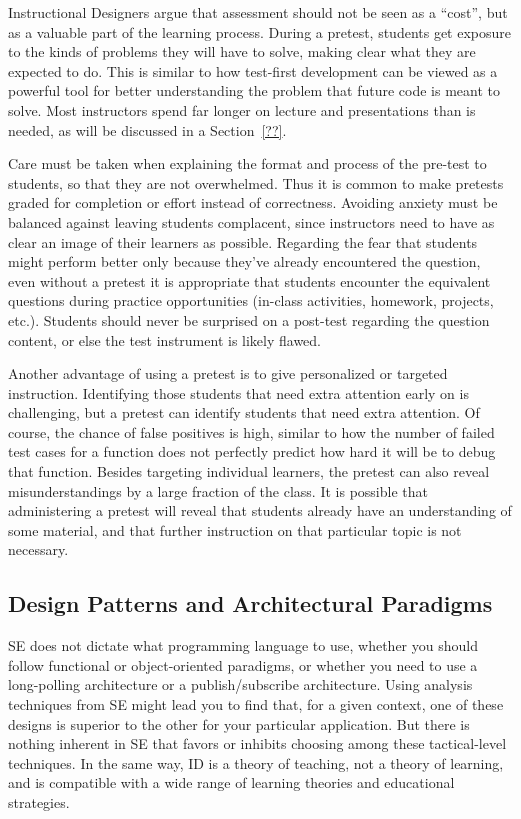 Instructional Designers argue that assessment should not be seen as a ``cost'', but as a valuable part of the learning process.
During a pretest, students get exposure to the kinds of problems they will have to solve, making clear what they are expected to do.
This is similar to how test-first development can be viewed as a powerful tool for better understanding the problem that future code is meant to solve.
Most instructors spend far longer on lecture and presentations than is needed, as will be discussed in a Section~\ref{??}.

Care must be taken when explaining the format and process of the pre-test to students, so that they are not overwhelmed.
Thus it is common to make pretests graded for completion or effort instead of correctness.
Avoiding anxiety must be balanced against leaving students complacent, since instructors need to have as clear an image of their learners as possible.
Regarding the fear that students might perform better only because they've already encountered the question, even without a pretest it is appropriate that students encounter the equivalent questions during practice opportunities (in-class activities, homework, projects, etc.).
Students should never be surprised on a post-test regarding the question content, or else the test instrument is likely flawed.

Another advantage of using a pretest is to give personalized or targeted instruction.
Identifying those students that need extra attention early on is challenging, but a pretest can identify students that need extra attention.
Of course, the chance of false positives is high, similar to how the number of failed test cases for a function does not perfectly predict how hard it will be to debug that function.
Besides targeting individual learners, the pretest can also reveal misunderstandings by a large fraction of the class.
It is possible that administering a pretest will reveal that students already have an understanding of some material, and that further instruction on that particular topic is not necessary.


\subsection{Design Patterns and Architectural Paradigms}

SE does not dictate what programming language to use, whether you should follow functional or object-oriented paradigms, or whether you need to use a long-polling architecture or a publish/subscribe architecture.
Using analysis techniques from SE might lead you to find that, for a given context, one of these designs is superior to the other for your particular application.
But there is nothing inherent in SE that favors or inhibits choosing among these tactical-level techniques.
In the same way, ID is a theory of teaching, not a theory of learning, and is compatible with a wide range of learning theories and educational strategies.

